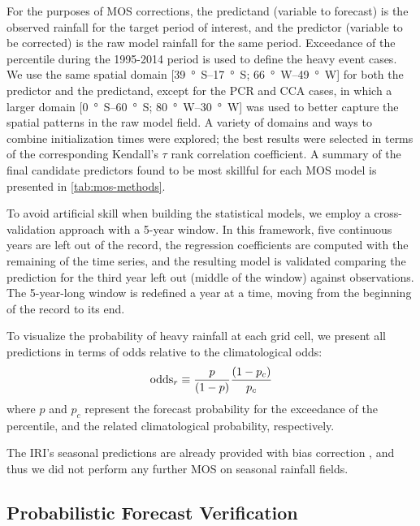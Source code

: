 \documentclass[twocol]{ametsoc}
\begin{document}
For the purposes of MOS corrections, the predictand (variable to forecast) is the observed rainfall for the target period of interest, and the predictor (variable to be corrected) is the raw model rainfall for the same period.
Exceedance of the  percentile during the 1995-2014 period is used to define the heavy event cases.
We use the same spatial domain [\SIrange{39}{17}{\degree S}; \SIrange{66}{49}{\degree W}] for both the predictor and the predictand, except for the PCR and CCA cases, in which a larger domain [\SIrange{0}{60}{\degree S}; \SIrange{80}{30}{\degree W}] was used to better capture the spatial patterns in the raw model field.
A variety of domains and ways to combine initialization times were explored; the best results were selected in terms of the corresponding Kendall's $\tau$ rank correlation coefficient.
A summary of the final candidate predictors found to be most skillful for each MOS model is presented in \cref{tab:mos-methods}.

To avoid artificial skill when building the statistical models, we employ a cross-validation approach with a 5-year window.
In this framework, five continuous years are left out of the record, the regression coefficients are computed with the remaining of the time series, and the resulting model is validated comparing the prediction for the third year left out (middle of the window) against observations.
The 5-year-long window is redefined a year at a time, moving from the beginning of the record to its end.

To visualize the probability of heavy rainfall at each grid cell, we present all predictions in terms of odds relative to the climatological odds:
\begin{equation} \label{eq:odds-ratio}
	\text{odds}_{r} \equiv \frac{p}{\qty(1 - p)} \frac{\qty(1 - p_c)}{p_c}
\end{equation}
where $p$ and $p_c$ represent the forecast probability for the exceedance of the  percentile, and the related climatological probability, respectively.

The IRI's seasonal predictions are already provided with bias correction \citep{Barnston:2010ge}, and thus we did not perform any further MOS on seasonal rainfall fields.

\subsection{Probabilistic Forecast Verification}
\end{document}
